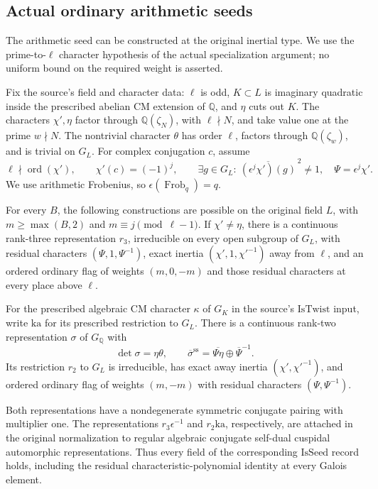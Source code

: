 \subsection{Actual ordinary arithmetic seeds}
\label{sec:selmer-arithmetic-seed}

The arithmetic seed can be constructed at the original inertial type.
We use the prime-to-\(\ell\) character hypothesis of the actual
specialization argument; no uniform bound on the required weight is
asserted.

Fix the source's field and character data: \(\ell\) is odd,
\(K\subset L\) is imaginary quadratic inside the prescribed abelian
CM extension of \(\mathbb Q\), and \(\eta\) cuts out \(K\).
The characters \(\chi',\eta\) factor through
\(\mathbb Q(\zeta_N)\), with \(\ell\nmid N\), and take value
one at the prime \(w\nmid N\).  The nontrivial character \(\theta\)
has order \(\ell\), factors through \(\mathbb Q(\zeta_w)\),
and is trivial on \(G_L\).  For complex conjugation \(c\), assume
\[
 \ell\nmid\operatorname{ord}(\chi'),\qquad
 \chi'(c)=(-1)^j,\qquad
 \exists g\in G_L:\ \overline{(\epsilon^j\chi')(g)}^{\,2}\ne1,
 \quad \Psi=\epsilon^j\chi'.                         \tag{AS1}
\]
We use arithmetic Frobenius, so \(\epsilon(\operatorname{Frob}_q)=q\).

\begin{proposition}
\label{prop:selmer-arithmetic-seed}
For every \(B\), the following constructions are possible on the
original field \(L\), with \(m\geq\max(B,2)\) and
\(m\equiv j\pmod{\ell-1}\).
If \(\chi'\ne\eta\), there is a continuous rank-three representation
\(r_3\), irreducible on every open subgroup of \(G_L\), with
residual characters \((\Psi,1,\Psi^{-1})\), exact inertia
\((\chi',1,\chi'^{-1})\) away from \(\ell\), and an ordered
ordinary flag of weights \((m,0,-m)\) and those residual characters
at every place above \(\ell\).

For the prescribed algebraic CM character \(\kappa\) of \(G_K\)
in the source's \(\mathrm{IsTwist}\) input, write \(\mathrm{ka}\)
for its prescribed restriction to \(G_L\).  There is a continuous
rank-two representation \(\sigma\) of \(G_{\mathbb Q}\) with
\[
 \det\sigma=\eta\theta,\qquad
 \overline\sigma^{\mathrm{ss}}=\overline{\Psi\eta}\oplus
       \overline\Psi^{-1}.
\]
Its restriction \(r_2\) to \(G_L\) is irreducible, has exact
away inertia \((\chi',\chi'^{-1})\), and ordered ordinary flag
of weights \((m,-m)\) with residual characters
\((\Psi,\Psi^{-1})\).

Both representations have a nondegenerate symmetric conjugate pairing
with multiplier one.  The representations \(r_3\epsilon^{-1}\)
and \(r_2\mathrm{ka}\), respectively, are attached in the original
normalization to regular algebraic conjugate self-dual cuspidal
automorphic representations.  Thus every field of the corresponding
\(\mathrm{IsSeed}\) record holds, including the residual
characteristic-polynomial identity at every Galois element.
\end{proposition}

